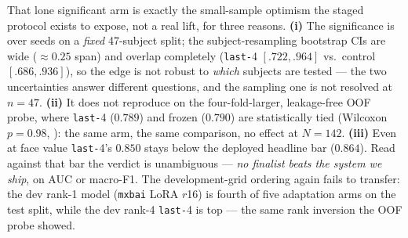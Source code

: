 That lone significant arm is exactly the small-sample optimism the staged protocol
exists to expose, not a real lift, for three reasons. \textbf{(i)} The significance
is over seeds on a \emph{fixed} 47-subject split; the subject-resampling bootstrap
CIs are wide ($\approx\!0.25$ span) and overlap completely (\texttt{last-}4
$[.722,.964]$ vs.\ control $[.686,.936]$), so the edge is not robust to \emph{which}
subjects are tested --- the two uncertainties answer different questions, and the
sampling one is not resolved at $n\!=\!47$. \textbf{(ii)} It does not reproduce on
the four-fold-larger, leakage-free OOF probe, where \texttt{last-}4 ($0.789$) and
frozen ($0.790$) are statistically tied (Wilcoxon $p=0.98$,
): the same arm, the same comparison, no effect at
$N\!=\!142$. \textbf{(iii)} Even at face value \texttt{last-}4's $0.850$ stays below
the deployed headline bar ($0.864$). Read against that bar the verdict is
unambiguous --- \emph{no finalist beats the system we ship}, on AUC or macro-F1.
The development-grid ordering again fails to transfer: the dev rank-1 model
(\texttt{mxbai} LoRA $r$16) is fourth of five adaptation arms on the test split,
while the dev rank-4 \texttt{last-}4 is top --- the same rank inversion the OOF
probe showed.

